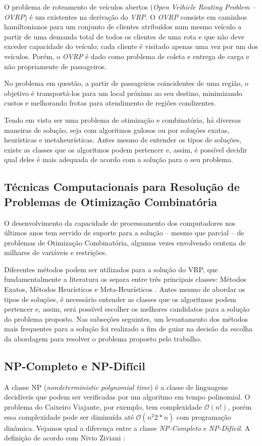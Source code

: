 O problema de roteamento de veículos abertos (\emph{Open Veihicle Routing Problem} -- \emph{OVRP}) é um existentes na derivação do \emph{VRP}. O \emph{OVRP} consiste em caminhos hamiltonianos para um conjunto de clientes atribuídos num mesmo veículo a partir de uma demanda total de todos os clientes de uma rota e que não deve exceder capacidade do veículo; cada cliente é visitado apenas uma vez por um dos veículos. Porém, o \emph{OVRP} é dado como problema de coleta e entrega de carga e não propriamente de passageiros.

No problema em questão, a partir de passageiros coincidentes de uma região, o objetivo é transportá-los para um local próximo ao seu destino, minimizando custos e melhorando frotas para atendimento de regiões condizentes. 

Tendo em vista ser uma problema de otimização e combinatória, há diversas maneiras de solução, seja com algoritmos gulosos ou por soluções exatas, heurísticas e metaheurísticas. Antes mesmo de entender os tipos de soluções, existe as classes que os algoritmos podem pertencer e, assim, é possível decidir qual deles é mais adequada de acordo com a solução para o seu problema.

\subsection{Técnicas Computacionais para Resolução de Problemas de Otimização Combinatória}
\label{tecnicas-computacionais}
O desenvolvimento da capacidade de processamento dos computadores nos últimos anos tem servido de suporte para a solução -- mesmo que parcial -- de problemas de Otimização Combinatória, algumas vezes envolvendo centena de milhares de variáveis e restrições.

Diferentes métodos podem ser utilizados para a solução do VRP, que fundamentalmente a literatura os separa entre três principais classes: Métodos Exatos, Métodos Heurísticos e Meta-Heurísticos \cite{maxwell}. Antes mesmo de abordar os tipos de soluções, é necessário entender as classes que os algoritmos podem pertencer e, assim, será possível escolher os melhores candidatos para a solução do problema proposto. Nas subseções seguintes, um levantamento dos métodos mais frequentes para a solução foi realizado a fim de guiar na decisão da escolha da abordagem para resolver o problema proposto pelo trabalho.

\subsection{NP-Completo e NP-Difícil}
\label{classes-np}
A classe NP (\emph{nondeterministic polynomial time}) é a classe de linguagens decidíveis que podem ser verificadas por um algoritmo em tempo polinomial. O problema do Caixeiro Viajante, por exemplo, tem complexidade $\mathcal{O}(n!)$, porém essa complexidade pode ser diminuída até $\mathcal{O}(n^2 2*n)$ com programação dinâmica. Vejamos qual a diferença entre a classe \emph{NP-Completo} e \emph{NP-Difícil}. A definição de acordo com Nivio Ziviani \cite{ziviani}:

